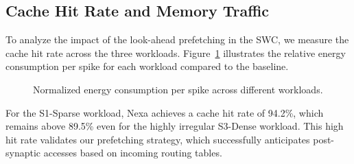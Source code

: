 \subsection{Cache Hit Rate and Memory Traffic}
To analyze the impact of the look-ahead prefetching in the SWC, we measure the cache hit rate across the three workloads. Figure~\ref{fig:results_chart} illustrates the relative energy consumption per spike for each workload compared to the baseline.

\begin{figure}[!t]
  \centering
  \caption{Normalized energy consumption per spike across different workloads.}
  \label{fig:results_chart}
\end{figure}

For the S1-Sparse workload, Nexa achieves a cache hit rate of 94.2\%, which remains above 89.5\% even for the highly irregular S3-Dense workload. This high hit rate validates our prefetching strategy, which successfully anticipates post-synaptic accesses based on incoming routing tables.
